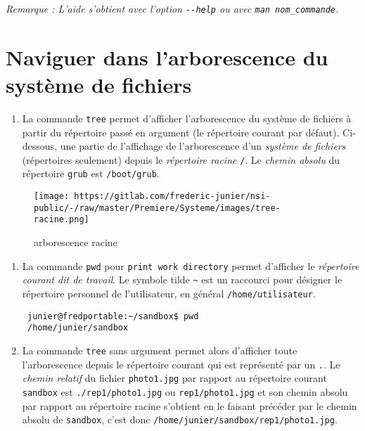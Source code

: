 \documentclass[
  11pt,
]{article}
\providecommand{\tightlist}{%
  \setlength{\itemsep}{0pt}\setlength{\parskip}{0pt}}
\newcounter{rque}
\newcounter{def}
\begin{document}
\emph{Remarque : L'aide s'obtient avec l'option \texttt{-\/-help} ou
avec \texttt{man\ nom\_commande}.}

\hypertarget{naviguer-dans-larborescence-du-systuxe8me-de-fichiers}{%
\section{Naviguer dans l'arborescence du système de
fichiers}\label{naviguer-dans-larborescence-du-systuxe8me-de-fichiers}}

\begin{enumerate}
\def\labelenumi{\arabic{enumi}.}
\tightlist
\item
  La commande \texttt{tree} permet d'afficher l'arborescence du système
  de fichiers à partir du répertoire passé en argument (le répertoire
  courant par défaut). Ci-dessous, une partie de l'affichage de
  l'arborescence d'un \emph{système de fichiers} (répertoires seulement)
  depuis le \emph{répertoire racine} \texttt{/}. Le \emph{chemin absolu}
  du répertoire \texttt{grub} est \texttt{/boot/grub}.
\end{enumerate}

\begin{figure}
\centering
\texttt{[image: https://gitlab.com/frederic-junier/nsi-public/-/raw/master/Premiere/Systeme/images/tree-racine.png]}
\caption{arborescence racine}
\end{figure}

\begin{enumerate}
\def\labelenumi{\arabic{enumi}.}
\setcounter{enumi}{1}
\item
  La commande \texttt{pwd} pour \texttt{print\ work\ directory} permet
  d'afficher le \emph{répertoire courant dit de travail}. Le symbole
  tilde \texttt{\textasciitilde{}} est un raccourci pour désigner le
  répertoire personnel de l'utilisateur, en général
  \texttt{/home/utilisateur}.

\begin{verbatim}
 junier@fredportable:~/sandbox$ pwd
 /home/junier/sandbox
\end{verbatim}
\item
  La commande \texttt{tree} sans argument permet alors d'afficher toute
  l'arborescence depuis le répertoire courant qui est représenté par un
  \texttt{.}. Le \emph{chemin relatif} du fichier \texttt{photo1.jpg}
  par rapport au répertoire courant \texttt{sandbox} est
  \texttt{./rep1/photo1.jpg} ou \texttt{rep1/photo1.jpg} et son chemin
  absolu par rapport au répertoire racine s'obtient en le faisant
  précéder par le chemin absolu de \texttt{sandbox}, c'est donc
  \texttt{/home/junier/sandbox/rep1/photo1.jpg}.
\end{enumerate}
\end{document}
